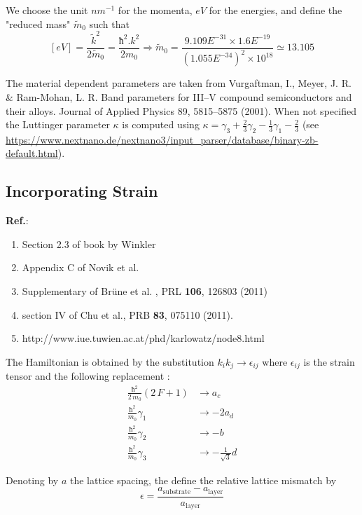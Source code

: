 \documentclass[prb,aps]{revtex4}
\begin{document}
		We choose the unit $nm^{-1}$ for the momenta, $eV$ for the energies, and define the "reduced mass"  $\tilde{m}_0$ such that
		$$
		[eV] =
		\frac{\tilde{k}^2}{2\tilde{m}_0}  =
		\frac{ħ^2 . k^2 }{2 m_0}
		\Rightarrow
		\tilde{m}_0 = \frac{9.109E^{-31} \times 1.6E^{-19}}{(1.055E^{-34})^2 \times 10^{18}} \simeq 13.105
		$$

		The material dependent parameters are taken from Vurgaftman, I., Meyer, J. R. \& Ram-Mohan, L. R. Band parameters for III–V compound semiconductors and their alloys. Journal of Applied Physics 89, 5815–5875 (2001). When not specified the Luttinger parameter $κ$ is computed using $κ = γ_3 + \frac{2}{3} γ_2 - \frac{1}{3} γ_1 - \frac{2}{3}$ (see \url{https://www.nextnano.de/nextnano3/input_parser/database/binary-zb-default.html}).


	\subsection{Incorporating Strain}

		{\bf Ref.}:
		\begin{enumerate}
			\item Section 2.3 of book by Winkler
			\item Appendix C of Novik et al.
			\item Supplementary of Brüne et al. , PRL {\bf 106}, 126803 (2011)
			\item section IV of Chu et al., PRB {\bf 83}, 075110 (2011).
			\item http://www.iue.tuwien.ac.at/phd/karlowatz/node8.html
		\end{enumerate}

		The Hamiltonian is obtained by the substitution $k_i k_j  \to ϵ_{ij} $ where $ϵ_{ij}$ is the strain tensor and the following replacement :
		\begin{align}
			\frac{ħ^2}{2\,m_0} (2\,F+1) &\to a_c\\
			\frac{ħ^2}{ m_0} γ_1&\to - 2 a_d\\
			\frac{ħ^2}{ m_0} γ_2 &\to -  b\\
			\frac{ħ^2}{ m_0} γ_3&\to - \frac{1}{\sqrt{3}} d
		\end{align}

		Denoting by $a$ the lattice spacing, the define the relative lattice mismatch by
		\begin{equation}
		ϵ = \frac{ a_{\textrm{substrate}} - a_{\textrm{layer}} } {a_{\textrm{layer}}}
		\end{equation}
\end{document}
